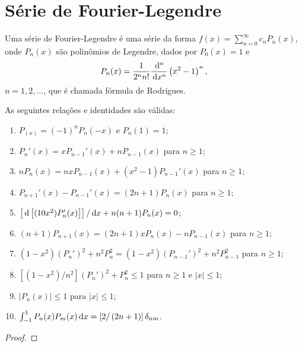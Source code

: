 \section{Série de Fourier-Legendre}
Uma série de Fourier-Legendre é uma série da forma $f(x) = \sum_{n = 0}^\infty
c_n P_n(x)$, onde $P_n(x)$ são polinômios de Legendre, dados por $P_0(x) = 1$ e
\begin{dmath*}
  P_n(x) = \frac{1}{2^n n!} \frac{\id{}^n}{\id{x}^n}\left( x^2 - 1 \right)^n,
\end{dmath*}
$n = 1, 2, \ldots$, que é chamada fórmula de Rodrigues.
\begin{prop}
  As seguintes relações e identidades são válidas:
  \begin{enumerate}
    \item $P_(x) = (-1)^n P_n(-x)$ e $P_n(1) = 1$;
    \item $P_n'(x) = x P_{n - 1}'(x) + n P_{n - 1}(x)$ para $n \geq 1$;
    \item $n P_n(x) = n x P_{n - 1}(x) + \left( x^2 - 1 \right) P_{n - 1}'(x)$ para $n \geq 1$;
    \item $P_{n + 1}'(x) - P_{n - 1}'(x) = \left( 2 n + 1 \right) P_n(x)$ para $n \geq 1$;
    \item $\left[ \, \mathrm{d}\left[ (1 0 x^2) P_n'(x) \right] \right] / \, \mathrm{d}x + n (n + 1) P_n(x) = 0$;
    \item $(n + 1) P_{n + 1}(x) = (2n + 1) x P_n(x) - n P_{n - 1}(x)$ para $n \geq 1$;
    \item $(1 - x^2) (P_n')^2 + n^2 P_n^2 = (1 - x^2) (P_{n - 1}')^2 + n^2 P_{n - 1}^2$ para $n \geq 1$;
    \item $\left[ (1 - x^2) / n^2 \right] (P_n')^2 + P_n^2 \leq 1$ para $n \geq 1$ e $|x| \leq 1$;
    \item $| P_n(x) | \leq 1$ para $|x| \leq 1$;
    \item $\int_{-1}^1 P_n(x) P_m(x) \, \mathrm{d}x = \left[ 2 / \left( 2 n + 1 \right) \right] \delta_{nm}$.
  \end{enumerate}
\end{prop}
\begin{proof}
\end{proof}

